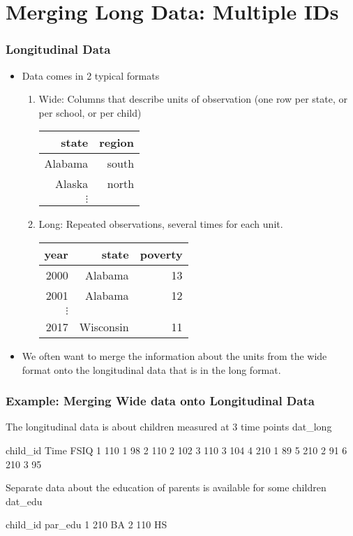 \documentclass[10pt,american]{beamer}
\renewenvironment{Schunk}{}{}
\renewenvironment{Sinput}{}{}
\begin{document}
\section{Merging Long Data: Multiple IDs}

\begin{frame}
\frametitle{Longitudinal Data}

\begin{itemize}
\item Data comes in 2 typical formats
\begin{enumerate}
\item Wide: Columns that describe units of observation (one row per state,
  or per school, or per child)
  
  \begin{tabular}{rr}
    state & region\tabularnewline
    \hline
    Alabama & south\tabularnewline
    Alaska & north\tabularnewline
    $\vdots$ & \tabularnewline
  \end{tabular}
\item Long: Repeated observations, several times for each unit. 
  
  \begin{tabular}{rrr}
year & state & poverty\tabularnewline
\hline
2000 & Alabama & 13\tabularnewline
2001 & Alabama & 12\tabularnewline
$\vdots$ & & \tabularnewline
2017 & Wisconsin & 11\tabularnewline
\end{tabular}
  
\end{enumerate}
\item We often want to merge the information about the units from the
  wide format onto the longitudinal data that is in the long format.

\end{itemize}
\end{frame}



\begin{frame}
\frametitle{Example: Merging Wide data onto Longitudinal Data}

The longitudinal data is about children measured at 3 time points
\begin{Schunk}
\begin{Sinput}
 dat_long
\end{Sinput}
\begin{Soutput}
  child_id Time FSIQ
1      110    1   98
2      110    2  102
3      110    3  104
4      210    1   89
5      210    2   91
6      210    3   95
\end{Soutput}
\end{Schunk}

Separate data about the education of parents is available
for some children
\begin{Schunk}
\begin{Sinput}
 dat_edu
\end{Sinput}
\begin{Soutput}
  child_id par_edu
1      210      BA
2      110      HS
\end{Soutput}
\end{Schunk}
\end{frame}
\end{document}
